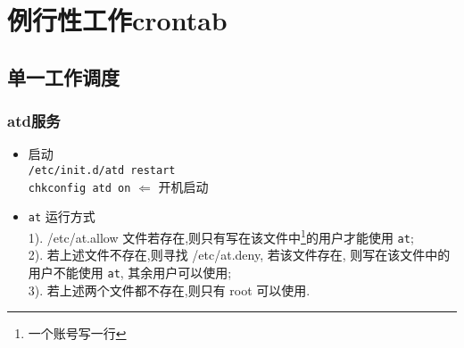 \section{例行性工作crontab}
\subsection{单一工作调度}
\subsubsection{atd服务}
\begin{itemize}
    \item 启动 \\
    \verb|/etc/init.d/atd restart| \\
    \verb|chkconfig atd on| $\Longleftarrow$ 开机启动

    \item \texttt{at} 运行方式\\
    1). /etc/at.allow 文件若存在,则只有写在该文件中\footnote[1]{一个账号写一行}的用户才能使用 \texttt{at};\\
    2). 若上述文件不存在,则寻找 /etc/at.deny, 若该文件存在, 则写在该文件中的用户不能使用 \texttt{at}, 其余用户可以使用;\\
    3). 若上述两个文件都不存在,则只有 root 可以使用.
\end{itemize}


